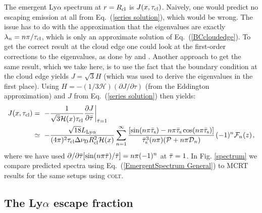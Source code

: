 \documentclass[fleqn,usenatbib]{mnras}
\newcommand{\taucl}{\tau_{\rm cl}}
\begin{document}
The emergent Ly$\alpha$ spectrum at $r = R_{\rm cl}$ is $J(x,\taucl)$. Naively, one would predict no escaping emission at all from Eq.~(\ref{series solution}), which would be wrong. The issue has to do with the approximation that the eigenvalues are exactly $\lambda_n = n \pi/\taucl$, which is only an approximate solution of Eq.~(\ref{BCcloudedge}). To get the correct result at the cloud edge one could look at the first-order corrections to the eigenvalues, as done by \cite{Dijkstra2006} and \cite{Seon2020}. Another approach to get the same result, which we take here, is to use the fact that the boundary condition at the cloud edge yields $J = \sqrt{3} H$ (which was used to derive the eigenvalues in the first place). Using $H = - (1/3 \mathcal{H}) (\partial J/\partial\tau)$ (from the Eddington approximation) and $J$ from Eq.~(\ref{series solution}) then yields:
\begin{align}
    J(x,\taucl) &=~ -\dfrac{1}{\sqrt{3} \mathcal{H}(x) \taucl} \dfrac{\partial J}{\partial \Bar{\tau}}\bigg|_{\Bar{\tau} = 1} \nonumber \\ &\simeq~ -\dfrac{\sqrt{18} L_{\rm Ly\alpha}}{(4\pi)^2  \taucl \Delta \nu_{\rm D} R_{\rm cl}^2 \mathcal{H}(x)} \sum_{n=1}^{\infty} \dfrac{ [\sin(n\pi \Bar{\tau}_{\rm s}) - n\pi \Bar{\tau}_{\rm s} \cos( n\pi \Bar{\tau}_{\rm s})] }{\Bar{\tau}_{\rm s}^3 (n \pi) (\mathcal{P} + n\pi \mathcal{D}_n)} \hspace{1 pt}  (-1)^n \mathcal{F}_n(z) \hspace{1 pt} \label{EmergentSpectrum General} ,
\end{align}
where we have used $\partial/\partial \Bar{\tau} [\sin(n \pi \Bar{\tau})/\Bar{\tau}] = n\pi (-1)^n$ at $\Bar{\tau} = 1$. In Fig. \ref{spectrum} we compare predicted spectra using Eq.~(\ref{EmergentSpectrum General}) to MCRT results for the same setups using \textsc{colt}.


\subsection{The Ly\texorpdfstring{\boldmath$\alpha$}{alpha} escape fraction}
\label{Escape fraction appendix}
\end{document}
